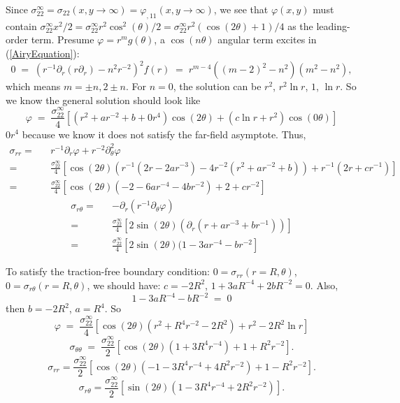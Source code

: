 \documentclass[12pt]{article}
\begin{document}
Since
$\sigma_{22}^\infty=\sigma_{22}(x,y\rightarrow\infty)=\varphi_{,11}(x,y\rightarrow\infty)$,
we see that $\varphi(x,y)$ must contain $\sigma_{22}^\infty x^2/2 =
\sigma_{22}^\infty r^2 \cos^2(\theta)/2 = \sigma_{22}^\infty r^2
(\cos(2\theta)+1)/4$ as the leading-order term.  Presume
$\varphi=r^m g(\theta)$, a $\cos(n\theta)$ angular term excites in
(\ref{AiryEquation}):
\begin{equation}
 0 \;=\; (r^{-1}\partial_r(r\partial_r)-n^2r^{-2})^2 f(r) \;=\;
 r^{m-4}((m-2)^2-n^2)(m^2-n^2),
\end{equation}
which means $m=\pm n, 2\pm n$.  For $n=0$, the solution can be $r^2$, $r^2\ln r$, $1$, $\ln r$.  So
we know the general solution should look like
\begin{equation}
 \varphi \;=\; \frac{\sigma_{22}^\infty}{4}\left[ 
 (r^2 + ar^{-2} + b + 0r^4)\cos(2\theta) + (c\ln r + r^2)\cos(0\theta)
 \right]
\end{equation}
$0r^4$ because we know it does not satisfy the far-field
asymptote. Thus,
\begin{eqnarray}
 \sigma_{rr} =&& r^{-1}\partial_r\varphi + r^{-2}\partial_\theta^2\varphi \nonumber\\
 =&& \frac{\sigma_{22}^\infty}{4} \left[ 
 \cos(2\theta)(r^{-1}(2r-2ar^{-3})-4r^{-2}(r^2 + ar^{-2} + b)) +  r^{-1}(2r+cr^{-1}) \right]
\nonumber\\
 =&& \frac{\sigma_{22}^\infty}{4} \left[ \cos(2\theta) ( -2 - 6ar^{-4} - 4br^{-2} ) + 2 + cr^{-2}
 \right]
\end{eqnarray}
\begin{eqnarray}
 \sigma_{r\theta} =&& -\partial_r(r^{-1}\partial_\theta\varphi) \nonumber\\
 =&& \frac{\sigma_{22}^\infty}{4} \left[ 
 2\sin(2\theta)( \partial_r(r + ar^{-3} + br^{-1} ) ) \right]
\nonumber\\
 =&& \frac{\sigma_{22}^\infty}{4} \left[2\sin(2\theta) (1 - 3ar^{-4} - br^{-2}
 \right]
\end{eqnarray}

To satisfy the traction-free boundary condition:
$0=\sigma_{rr}(r=R,\theta)$, $0=\sigma_{r\theta}(r=R,\theta)$, we
should have: $c=-2R^2$, $1+3aR^{-4}+2bR^{-2}=0$. Also,
\begin{equation}
 1 - 3aR^{-4} - bR^{-2} \;=\; 0
\end{equation}
then $b=-2R^2$, $a=R^4$.  So
\begin{equation}
 \varphi \;=\; \frac{\sigma_{22}^\infty}{4}\left[ 
 \cos(2\theta)(r^2 + R^4r^{-2} - 2R^2) + r^2 - 2R^2\ln r \right]
\end{equation} 
\begin{equation}
 \sigma_{\theta\theta} \;=\; \frac{\sigma_{22}^\infty}{2}\left[ 
 \cos(2\theta)(1 + 3R^4r^{-4}) + 1 + R^2r^{-2}  \right].
\end{equation}
\begin{equation}
 \sigma_{rr} = \frac{\sigma_{22}^\infty}{2} 
\left[ \cos(2\theta) ( -1 - 3R^4r^{-4} + 4R^2r^{-2} ) + 1 - R^2r^{-2}
 \right].
\end{equation}
\begin{equation}
 \sigma_{r\theta} = 
\frac{\sigma_{22}^\infty}{2} \left[\sin(2\theta) (1 - 3R^4r^{-4} + 2R^2 r^{-2})
 \right].
\end{equation}
\end{document}
